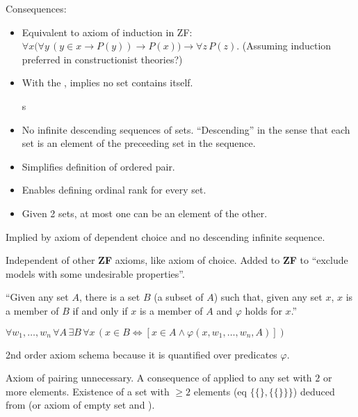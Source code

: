 Consequences:
\begin{itemize}
\item 
Equivalent to axiom of induction\cite{wiki:Epsilon-induction} 
in ZF:
$\forall x
{\Big (}
\forall y\,(y\in x\rightarrow P(y))\rightarrow P(x)
{\Big )}
\rightarrow \forall z\,P(z)$.
(Assuming induction preferred in constructionist theories?)

\item With the , 
implies no set contains itself.

s\item No infinite descending sequences of sets.
``Descending'' in the sense that each set is an element of the
preceeding set in the sequence.

\item Simplifies definition of ordered pair.

\item Enables defining ordinal rank for every set.

\item Given 2 sets, at most one can be an element of the other.
\end{itemize}

Implied by axiom of dependent choice and 
no descending infinite sequence.

Independent of other \textbf{ZF} axioms, like axiom of choice.
Added to \textbf{ZF} to 
``exclude models with some undesirable properties''.

\label{sec:Axiom-schema-of-specification}

``Given any set $A$, there is a set $B$ (a subset of $A$) 
such that, given any set $x$, 
$x$ is a member of $B$ if and only if $x$ is a member of $A$ 
and $\varphi$ holds for $x$.''
\cite{wiki:Axiom_schema_of_specification}

${\displaystyle 
\forall w_{1},\ldots ,w_{n}\,
\forall A\,\exists B\,
\forall x\,
(x\in B
\Leftrightarrow
[x\in A\land \varphi (x,w_{1},\ldots ,w_{n},A)])}$
 
2nd order axiom schema because it is quantified over predicates
 $\varphi$.
 
\label{sec:Axiom-of-pairing}

Axiom of pairing unnecessary.
A consequence of 
applied to any set with $2$ or more elements.
Existence of a set with $\geq 2$ elements
(eq $\{ \{\}, \{ \{\} \} \}$)
deduced from 
(or 
axiom of empty set\cite{wiki:Axiom_of_empty_set}
and ).

